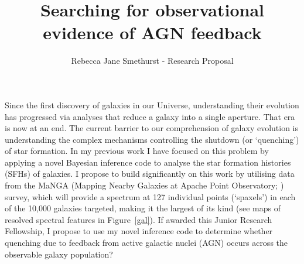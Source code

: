 \documentclass[11pt]{article}
\title{{\bf \large \vspace{-2.5em} Searching for observational evidence of AGN feedback}\vspace{-1.0em}}
\author{\normalsize \vspace{-1.5em} Rebecca Jane Smethurst - Research Proposal}
\date{}
\begin{document}
\maketitle

%

Since the first discovery of galaxies in our Universe, understanding their evolution has progressed via analyses that reduce a galaxy into a single aperture. That era is now at an end. The current barrier to our comprehension of galaxy evolution is understanding the complex mechanisms controlling the shutdown (or `quenching') of star formation. In my previous work I have focused on this problem by applying a novel Bayesian inference code \citep[first described in][]{smethurst15} to analyse the star formation histories (SFHs) of galaxies. I propose to build significantly on this work by utilising data from the MaNGA (Mapping Nearby Galaxies at Apache Point Observatory; \citealt{Bundy15}) survey, which will provide a spectrum at 127 individual points (`spaxels') in each of the 10,000 galaxies targeted, making it the largest of its kind (see maps of resolved spectral features in Figure~\ref{gal}). If awarded this Junior Research Fellowship, I propose to use my novel inference code to determine whether quenching due to feedback from active galactic nuclei (AGN) occurs across the observable galaxy population? 

\vspace{-0.5em}
\end{document}
